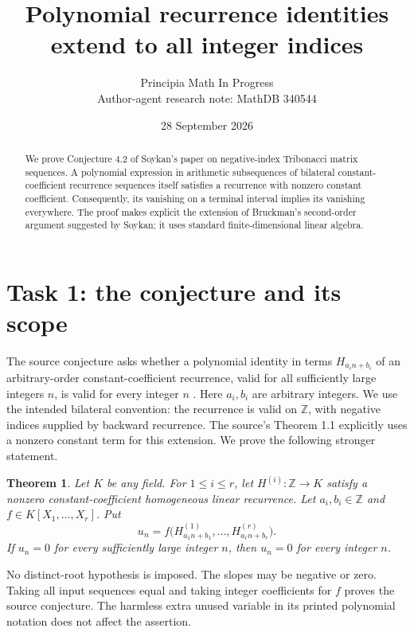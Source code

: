 \documentclass[11pt]{article}
\title{Polynomial recurrence identities extend to all integer indices}
\author{Principia Math In Progress\\Author-agent research note: MathDB 340544}
\date{28 September 2026}
\newtheorem{theorem}{Theorem}
\begin{document}
\maketitle
\begin{abstract}
We prove Conjecture 4.2 of Soykan's paper on negative-index Tribonacci
matrix sequences. A polynomial expression in arithmetic subsequences of
bilateral constant-coefficient recurrence sequences itself satisfies a
recurrence with nonzero constant coefficient. Consequently, its vanishing
on a terminal interval implies its vanishing everywhere. The proof makes
explicit the extension of Bruckman's second-order argument suggested by
Soykan; it uses standard finite-dimensional linear algebra.
\end{abstract}

\section*{Task 1: the conjecture and its scope}
The source conjecture asks whether a polynomial identity in terms
$H_{a_i n+b_i}$ of an arbitrary-order constant-coefficient recurrence,
valid for all sufficiently large integers $n$, is valid for every integer
$n$ \cite[Conjecture 4.2]{Soykan}. Here $a_i,b_i$ are arbitrary integers.
We use the intended bilateral convention: the recurrence is valid on
$\mathbb Z$, with negative indices supplied by backward recurrence.
The source's Theorem 1.1 explicitly uses a nonzero constant term for this
extension. We prove the following stronger statement.

\begin{theorem}\label{main}
Let $K$ be any field. For $1\leq i\leq r$, let
$H^{(i)}:\mathbb Z\to K$ satisfy a nonzero constant-coefficient homogeneous
linear recurrence. Let $a_i,b_i\in\mathbb Z$ and
$f\in K[X_1,\ldots,X_r]$. Put
\[
 u_n=f\bigl(H^{(1)}_{a_1n+b_1},\ldots,H^{(r)}_{a_rn+b_r}\bigr).
\]
If $u_n=0$ for every sufficiently large integer $n$, then $u_n=0$
for every integer $n$.
\end{theorem}

No distinct-root hypothesis is imposed. The slopes may be negative or
zero. Taking all input sequences equal and taking integer coefficients
for $f$ proves the source conjecture. The harmless extra unused variable
in its printed polynomial notation does not affect the assertion.
\end{document}
